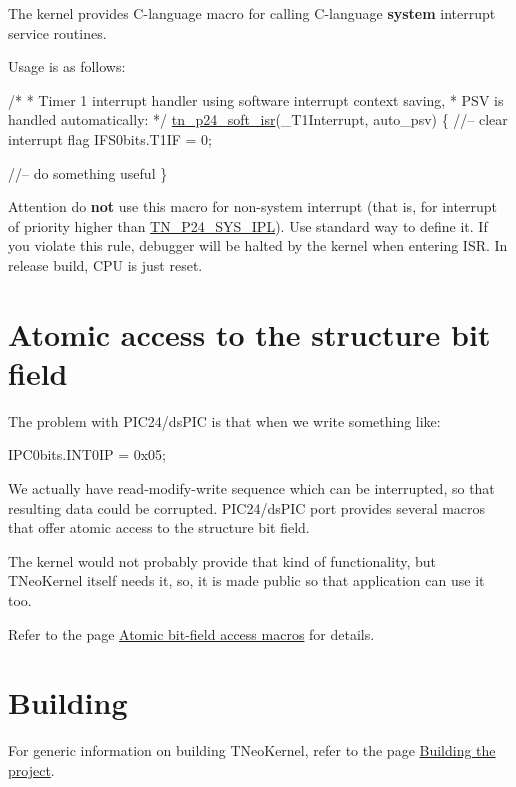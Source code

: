 The kernel provides C-\/language macro for calling C-\/language {\bfseries system} interrupt service routines.

Usage is as follows\+:


\begin{DoxyCode}
\textcolor{comment}{/* }
\textcolor{comment}{ * Timer 1 interrupt handler using software interrupt context saving,  }
\textcolor{comment}{ * PSV is handled automatically:}
\textcolor{comment}{ */}
\hyperlink{tn__arch__pic24_8h_a0b184d3c15066f5504144379d2624ff3}{tn\_p24\_soft\_isr}(\_T1Interrupt, auto\_psv)
\{
   \textcolor{comment}{//-- clear interrupt flag}
   IFS0bits.T1IF = 0;

   \textcolor{comment}{//-- do something useful}
\}
\end{DoxyCode}


\begin{DoxyAttention}{Attention}
do {\bfseries not} use this macro for non-\/system interrupt (that is, for interrupt of priority higher than {\ttfamily \hyperlink{tn__cfg__default_8h_a4feb7eb34fc2f175167b7496b63c398a}{T\+N\+\_\+\+P24\+\_\+\+S\+Y\+S\+\_\+\+I\+P\+L}}). Use standard way to define it. If you violate this rule, debugger will be halted by the kernel when entering I\+S\+R. In release build, C\+P\+U is just reset.
\end{DoxyAttention}
\hypertarget{pic24_details_pic24_bfa}{}\section{Atomic access to the structure bit field}\label{pic24_details_pic24_bfa}
The problem with P\+I\+C24/ds\+P\+I\+C is that when we write something like\+:


\begin{DoxyCode}
IPC0bits.INT0IP = 0x05;
\end{DoxyCode}


We actually have read-\/modify-\/write sequence which can be interrupted, so that resulting data could be corrupted. P\+I\+C24/ds\+P\+I\+C port provides several macros that offer atomic access to the structure bit field.

The kernel would not probably provide that kind of functionality, but T\+Neo\+Kernel itself needs it, so, it is made public so that application can use it too.

Refer to the page \hyperlink{tn__arch__pic24__bfa_8h}{Atomic bit-\/field access macros} for details.\hypertarget{pic24_details_pic24_building}{}\section{Building}\label{pic24_details_pic24_building}
For generic information on building T\+Neo\+Kernel, refer to the page \hyperlink{building}{Building the project}.

